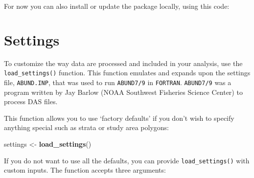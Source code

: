 \documentclass[
]{book}
\newenvironment{Shaded}{\begin{snugshade}}{\end{snugshade}}
\newcommand{\CommentTok}[1]{\textcolor[rgb]{0.56,0.35,0.01}{\textit{#1}}}
\newcommand{\ControlFlowTok}[1]{\textcolor[rgb]{0.13,0.29,0.53}{\textbf{#1}}}
\newcommand{\KeywordTok}[1]{\textcolor[rgb]{0.13,0.29,0.53}{\textbf{#1}}}
\newcommand{\NormalTok}[1]{#1}
\newcommand{\OperatorTok}[1]{\textcolor[rgb]{0.81,0.36,0.00}{\textbf{#1}}}
\newcommand{\StringTok}[1]{\textcolor[rgb]{0.31,0.60,0.02}{#1}}
\begin{document}
For now you can also install or update the package locally, using this code:

\begin{Shaded}
\end{Shaded}

\hypertarget{settings}{%
\chapter{Settings}\label{settings}}

To customize the way data are processed and included in your analysis, use the \texttt{load\_settings()} function. This function emulates and expands upon the settings file, \texttt{ABUND.INP}, that was used to run \texttt{ABUND7/9} in \texttt{FORTRAN}. \texttt{ABUND7/9} was a program written by Jay Barlow (NOAA Southwest Fisheries Science Center) to process DAS files.

This function allows you to use `factory defaults' if you don't wish to specify anything special such as strata or study area polygons:

\begin{Shaded}
\begin{Highlighting}[]
\NormalTok{settings <-}\StringTok{ }\KeywordTok{load_settings}\NormalTok{()}
\end{Highlighting}
\end{Shaded}

If you do not want to use all the defaults, you can provide \texttt{load\_settings()} with custom inputs. The function accepts three arguments:
\end{document}
